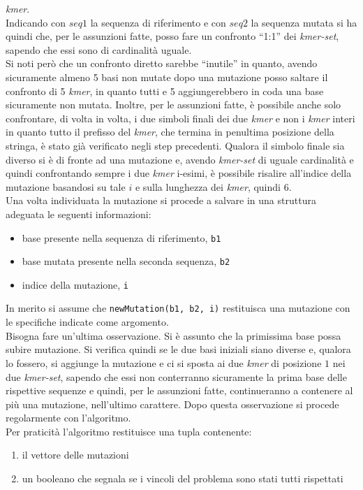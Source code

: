 \documentclass[a4paper,12pt, oneside]{book}
\begin{document}
\textit{kmer}. \\
Indicando con $seq1$ la sequenza di riferimento e con $seq2$ la sequenza mutata
si ha quindi che, per le assunzioni fatte, posso fare un confronto ``1:1'' dei
\textit{kmer-set}, sapendo che essi sono di cardinalità uguale.\\
Si noti però che un confronto diretto sarebbe ``inutile'' in quanto, avendo
sicuramente almeno 5 basi non mutate dopo una mutazione posso saltare il
confronto di 5 \textit{kmer}, in quanto tutti e 5 aggiungerebbero in coda una
base sicuramente non mutata. Inoltre, per le assunzioni fatte, è possibile anche
solo confrontare, di volta in volta, i due simboli finali dei due \textit{kmer}
e non i \textit{kmer} interi in quanto tutto il prefisso del \textit{kmer}, che
termina in penultima posizione della stringa, è stato già verificato negli step
precedenti. Qualora il simbolo finale sia diverso si è di fronte ad una
mutazione e, avendo \textit{kmer-set} di uguale cardinalità e quindi
confrontando sempre i due \textit{kmer} i-esimi, è possibile risalire all'indice
della mutazione basandosi su tale $i$ e sulla lunghezza dei \textit{kmer},
quindi $6$.\\
Una volta individuata la mutazione si procede a salvare in una struttura
adeguata le seguenti informazioni:
\begin{itemize}
  \item base presente nella sequenza di riferimento, \texttt{b1}
  \item base mutata presente nella seconda sequenza, \texttt{b2}
  \item indice della mutazione, \texttt{i}
\end{itemize}
In merito si assume che \texttt{newMutation(b1, b2, i)} restituisca una
mutazione con le specifiche indicate come argomento.\\
Bisogna fare un'ultima osservazione. Si è assunto che la primissima base possa
subire mutazione. Si verifica quindi se le due basi iniziali siano diverse e,
qualora lo fossero, si aggiunge la mutazione e ci si sposta ai due \textit{kmer}
di posizione $1$ nei due \textit{kmer-set}, sapendo che essi non conterranno
sicuramente la prima base delle rispettive sequenze e quindi, per le assunzioni
fatte, continueranno a contenere al più una mutazione, nell'ultimo
carattere. Dopo questa osservazione 
si procede regolarmente con l'algoritmo.\\
Per praticità l'algoritmo restituisce una tupla contenente:
\begin{enumerate}
  \item il vettore delle mutazioni
  \item un booleano che segnala se i vincoli del problema sono stati tutti
  rispettati 
\end{enumerate}
\end{document}

